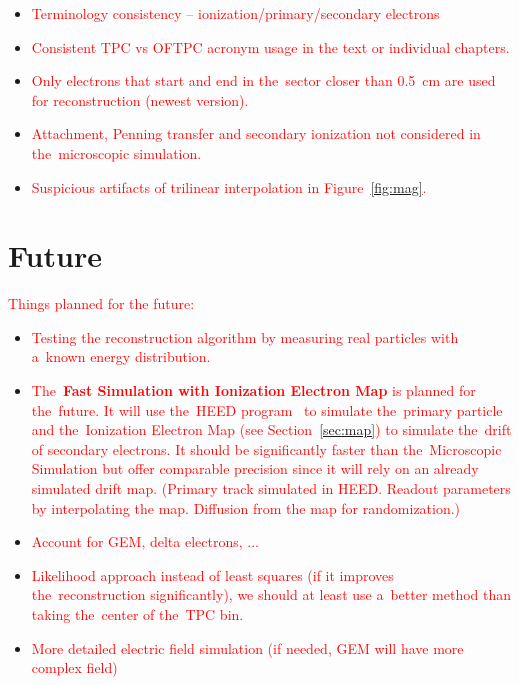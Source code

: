 		\begin{itemize}[topsep=4pt,itemsep=2pt]
			\item \textcolor{red}{Terminology consistency -- ionization/primary/secondary electrons}
			\item \textcolor{red}{Consistent \ac{TPC} vs \ac{OFTPC} acronym usage in the text or individual chapters.}
			\item \textcolor{red}{Only electrons that start and end in the~sector closer than 0.5~cm are used for reconstruction (newest version).}
			\item \textcolor{red}{Attachment, Penning transfer and secondary ionization not considered in the~microscopic simulation.}
			\item \textcolor{red}{Suspicious artifacts of trilinear interpolation in Figure~\ref{fig:mag}.}
		\end{itemize}
		
	\section*{Future}
		\textcolor{red}{Things planned for the future:}
		\begin{itemize}[topsep=4pt,itemsep=2pt]
			\item \textcolor{red}{Testing the reconstruction algorithm by measuring real particles with a~known energy distribution.}
			\item \textcolor{red}{The~\textbf{Fast Simulation with Ionization Electron Map} is planned for the~future. It will use the~\ac{HEED} program~\cite{HEED} to simulate the~primary particle and the~Ionization Electron Map (see Section~\ref{sec:map}) to simulate the~drift of secondary electrons. It should be significantly faster than the~Microscopic Simulation but offer comparable precision since it will rely on an already simulated drift map. (Primary track simulated in HEED. Readout parameters by interpolating the map.	Diffusion from the map for randomization.)}
			\item \textcolor{red}{Account for GEM, delta electrons, ...}
			\item \textcolor{red}{Likelihood approach instead of least squares (if it improves the~reconstruction significantly), we should at least use a~better method than taking the~center of the~TPC bin.}
			\item \textcolor{red}{More detailed electric field simulation (if needed, GEM will have more complex field)}
		\end{itemize}
		
